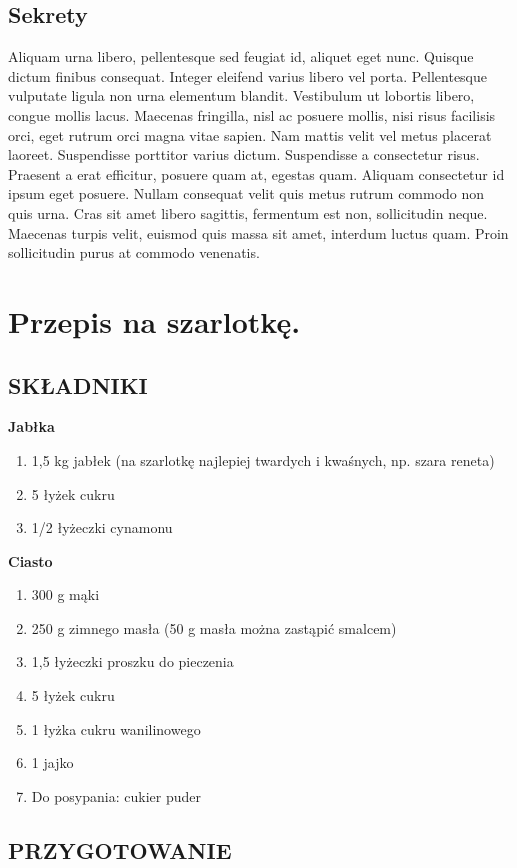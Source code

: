 \documentclass[12pt, letterpaper,titlepage]{article}
\begin{document}
\subsection{Sekrety}
Aliquam urna libero, pellentesque sed feugiat id, aliquet eget nunc. Quisque dictum finibus consequat. Integer eleifend varius libero vel porta. Pellentesque vulputate ligula non urna elementum blandit. Vestibulum ut lobortis libero, congue mollis lacus. Maecenas fringilla, nisl ac posuere mollis, nisi risus facilisis orci, eget rutrum orci magna vitae sapien. Nam mattis velit vel metus placerat laoreet. Suspendisse porttitor varius dictum. Suspendisse a consectetur risus. Praesent a erat efficitur, posuere quam at, egestas quam. Aliquam consectetur id ipsum eget posuere. Nullam consequat velit quis metus rutrum commodo non quis urna. Cras sit amet libero sagittis, fermentum est non, sollicitudin neque. Maecenas turpis velit, euismod quis massa sit amet, interdum luctus quam. Proin sollicitudin purus at commodo venenatis. 
\newpage
\section{Przepis na szarlotkę.}
\subsection{SKŁADNIKI}
\textbf{Jabłka} 
\begin{enumerate}[•]
\item 1,5 kg jabłek (na szarlotkę najlepiej twardych i kwaśnych, np. szara reneta)
\item 5 łyżek cukru
\item 1/2 łyżeczki cynamonu
\end{enumerate}
\textbf{Ciasto}
\begin{enumerate}[•]
\item 300 g mąki
\item 250 g zimnego masła (50 g masła można zastąpić smalcem)
\item 1,5 łyżeczki proszku do pieczenia
\item 5 łyżek cukru
\item 1 łyżka cukru wanilinowego
\item 1 jajko
\item Do posypania: cukier puder
\end{enumerate}
\subsection{PRZYGOTOWANIE}
\end{document}

